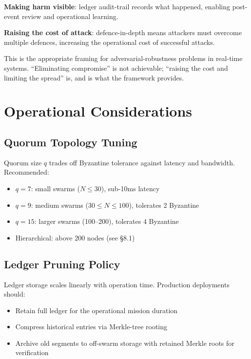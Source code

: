 \documentclass[sigconf,nonacm]{acmart}
\begin{document}
\textbf{Making harm visible}: ledger audit-trail records what
happened, enabling post-event review and operational learning.

\textbf{Raising the cost of attack}: defence-in-depth means
attackers must overcome multiple defences, increasing the
operational cost of successful attacks.

This is the appropriate framing for adversarial-robustness
problems in real-time systems. ``Eliminating compromise'' is not
achievable; ``raising the cost and limiting the spread'' is, and
is what the framework provides.

\section{Operational Considerations}

\subsection{Quorum Topology Tuning}

Quorum size $q$ trades off Byzantine tolerance against latency
and bandwidth. Recommended:

\begin{itemize}
  \item $q = 7$: small swarms ($N \leq 30$), sub-10ms latency
  \item $q = 9$: medium swarms ($30 \leq N \leq 100$), tolerates 2
        Byzantine
  \item $q = 15$: larger swarms (100--200), tolerates 4 Byzantine
  \item Hierarchical: above 200 nodes (see §8.1)
\end{itemize}

\subsection{Ledger Pruning Policy}

Ledger storage scales linearly with operation time. Production
deployments should:

\begin{itemize}
  \item Retain full ledger for the operational mission duration
  \item Compress historical entries via Merkle-tree
        rooting~\cite{crosby2024merkleaudit}
  \item Archive old segments to off-swarm storage with retained
        Merkle roots for verification
\end{itemize}
\end{document}
